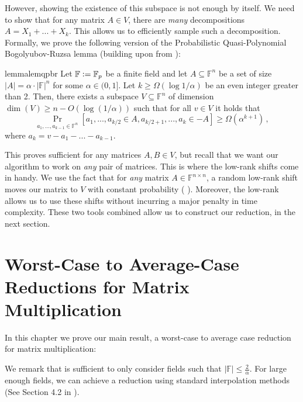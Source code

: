 \documentclass[12pt]{caltech_thesis}
\newcommand{\defeq}{\vcentcolon=}
\def\F{\mathbb{F}}
\begin{document}
However, showing the existence of this subspace is not enough by itself. We need to show that for any matrix $A \in V$, there are \textit{many} decompositions $A = X_1 + ... + X_k$. This allows us to efficiently sample such a decomposition. Formally, we prove the following version of the Probabilistic Quasi-Polynomial Bogolyubov-Ruzsa lemma (building upon  from \cite{asadi2022worstcase}):

\begin{restatable}{lemma}{lemqpbr}
    \label{lem:qpbr}
    Let $\F \defeq \F_p$ be a finite field and let $A \subseteq \F^n$ be a set of size $|A| = \alpha\cdot|\F|^n$ for some $\alpha \in (0,1]$.
    Let $k \geq \Omega(\log 1/\alpha)$ be an even integer greater than 2.
    Then, there exists a subspace $V \subseteq \mathbb{F}^n$ of dimension $\dim(V) \geq n - O(\log(1/\alpha))$ such that for all $v \in V$ it holds that
    \begin{equation}
    \label{eq:qpbr}
        \Pr_{a_1, ..., a_{k-1} \in \mathbb{F}^n}[a_1, ..., a_{k/2} \in A, a_{k/2 + 1}, ..., a_k \in -A] \geq \Omega(\alpha^{k+1})\, ,
    \end{equation}
    where $a_k = v - a_1 - ... - a_{k-1}$.
\end{restatable}

This proves sufficient for any matrices $A,B \in V$, but recall that we want our algorithm to work on \textit{any} pair of matrices. This is where the low-rank shifts come in handy. We use the fact that for \textit{any} matrix $A \in \F^{n \times n}$, a random low-rank shift moves our matrix to $V$ with constant probability ( \cite{asadi2022worstcase}). Moreover, the low-rank allows us to use these shifts without incurring a major penalty in time complexity. These two tools combined allow us to construct our reduction, in the next section.

\chapter{Worst-Case to Average-Case Reductions for Matrix Multiplication}
In this chapter we prove our main result, a worst-case to average case reduction for matrix multiplication:

\thmreduction*

We remark that is sufficient to only consider fields such that  $|\F| \leq \frac{2}{\alpha}$.
For large enough fields, we can achieve a reduction using standard interpolation methods (See Section 4.2 in \cite{asadi2022worstcase}).
\end{document}
